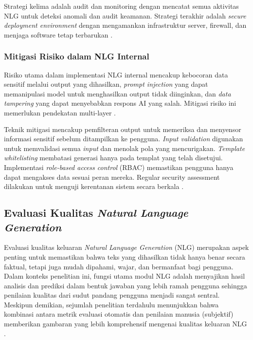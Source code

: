Strategi kelima adalah audit dan monitoring dengan mencatat semua aktivitas NLG untuk deteksi anomali dan audit keamanan. Strategi terakhir adalah \textit{secure deployment environment} dengan mengamankan infrastruktur server, firewall, dan menjaga software tetap terbarukan \autocite{itconvergence2024generative,aws2024securing}.

\subsubsection{Mitigasi Risiko dalam NLG Internal}

Risiko utama dalam implementasi NLG internal mencakup kebocoran data sensitif melalui output yang dihasilkan, \textit{prompt injection} yang dapat memanipulasi model untuk menghasilkan output tidak diinginkan, dan \textit{data tampering} yang dapat menyebabkan respons AI yang salah. Mitigasi risiko ini memerlukan pendekatan multi-layer \autocite{postgresql2024generative}.

Teknik mitigasi mencakup pemfilteran output untuk memeriksa dan menyensor informasi sensitif sebelum ditampilkan ke pengguna. \textit{Input validation} digunakan untuk memvalidasi semua \textit{input} dan menolak pola yang mencurigakan. \textit{Template whitelisting} membatasi generasi hanya pada templat yang telah disetujui. Implementasi \textit{role-based access control} (RBAC) memastikan pengguna hanya dapat mengakses data sesuai peran mereka. Regular security assessment dilakukan untuk menguji kerentanan sistem secara berkala \autocite{edpb2025privacy,velotix2025security}.

\subsection{Evaluasi Kualitas \textit{Natural Language Generation}}

Evaluasi kualitas keluaran \textit{Natural Language Generation} (NLG) merupakan aspek penting untuk memastikan bahwa teks yang dihasilkan tidak hanya benar secara faktual, tetapi juga mudah dipahami, wajar, dan bermanfaat bagi pengguna. Dalam konteks penelitian ini, fungsi utama modul NLG adalah menyajikan hasil analisis dan prediksi dalam bentuk jawaban yang lebih ramah pengguna sehingga penilaian kualitas dari sudut pandang pengguna menjadi sangat sentral. Meskipun demikian, sejumlah penelitian terdahulu menunjukkan bahwa kombinasi antara metrik evaluasi otomatis dan penilaian manusia (subjektif) memberikan gambaran yang lebih komprehensif mengenai kualitas keluaran NLG \autocite{Celikyilmaz2020EvalTextGen,Sai2020NLGSurvey,vanDerLee2021HumanEval}.

